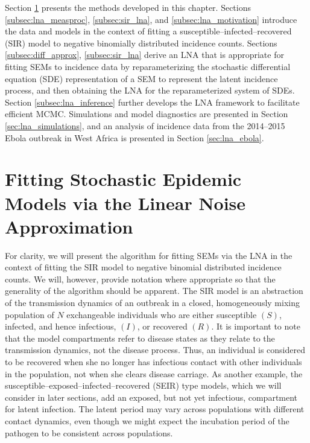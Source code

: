 Section \ref{sec:lna_methods} presents the methods developed in this chapter. Sections \ref{subsec:lna_measproc}, \ref{subsec:sir_lna}, and \ref{subsec:lna_motivation} introduce the data and models in the context of fitting a susceptible--infected--recovered (SIR) model to negative binomially distributed incidence counts. Sections \ref{subsec:diff_approx}, \ref{subsec:sir_lna} derive an LNA that is appropriate for fitting SEMs to incidence data by reparameterizing the stochastic differential equation (SDE) representation of a SEM to represent the latent incidence process, and then obtaining  the LNA for the reparameterized system of SDEs. Section \ref{subsec:lna_inference} further develops the LNA framework to facilitate efficient MCMC. Simulations and model diagnostics are presented in Section \ref{sec:lna_simulations}, and an analysis of incidence data from the 2014--2015 Ebola outbreak in West Africa is presented in Section \ref{sec:lna_ebola}.

\section{Fitting Stochastic Epidemic Models via the Linear Noise Approximation}
\label{sec:lna_methods}

For clarity, we will present the algorithm for fitting SEMs via the LNA in the context of fitting the SIR model to negative binomial distributed incidence counts. We will, however, provide notation where appropriate so that the generality of the algorithm should be apparent. The SIR model is an abstraction of the transmission dynamics of an outbreak in a closed, homogeneously mixing population of $ N $ exchangeable individuals who are either susceptible $ (S) $, infected, and hence infectious, $ (I) $, or recovered $ (R) $. It is important to note that the model compartments refer to disease states as they relate to the transmission dynamics, not the disease process. Thus, an individual is considered to be recovered when she no longer has infectious contact with other individuals in the population, not when she clears disease carriage. As another example, the susceptible--exposed--infected--recovered (SEIR) type models, which we will consider in later sections, add an exposed, but not yet infectious, compartment for latent infection. The latent period may vary across populations with different contact dynamics, even though we might expect the incubation period of the pathogen to be consistent across populations.

